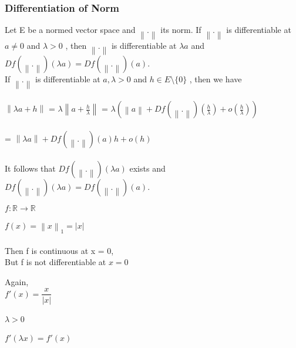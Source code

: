 \documentclass{beamer}
\newcommand{\R}{\mathbb{R}}
\newcommand\norm[1]{\left\lVert#1\right\rVert}
\begin{document}
\begin{frame}
\frametitle{Differentiation of Norm}

\begin{block}{Let E be a normed vector space and $ \norm{.}$ its norm. If $\norm{.} $ is
differentiable at $a \neq 0$ and $ \lambda > 0$ , then $ \norm{.} $ is differentiable at $\lambda a$ and $ Df(\norm{.})(\lambda a) = Df(\norm{.})(a)$.}
~\\
If $\norm{.} $ is differentiable at $a, \lambda > 0 $ and $h \in E \setminus \{0\}$ , then we have\\~\\

\hspace*{5mm} $ \norm{\lambda a + h}$ = $\lambda \norm{a + \frac{h}{\lambda}} $ = $ \lambda \left( \norm{a} + Df(\norm{.}) (\frac{h}{\lambda}) + o(\frac{h}{\lambda})\right)$ \\~\\ \hspace*{2cm}= $\norm{\lambda a} + Df(\norm{.})(a)h + o(h)$ \\~\\

It follows that $Df(\norm{.})(\lambda a)$ exists and $Df(\norm{.})(\lambda a) = Df(\norm{.})(a)$.\\

\end{block}
\end{frame}

\begin{frame}
\begin{example}
\begin{center}

$f : \R \rightarrow \R$\\~\\
$ f(x) = \norm{x}_1 = |x|$\\~\\

Then f is continuous at x = 0,\\

But f is not differentiable at $x = 0$\\

\pause 

Again,\\

$f'(x) = \dfrac{x}{|x|}$\\~\\

$ \lambda > 0$\\~\\

$ f'(\lambda x) = f'(x)$\\


\end{center}

\end{example}
\end{frame}
\end{document}
